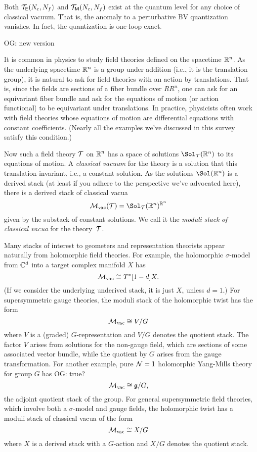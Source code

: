 \documentclass[11pt]{amsart}
\def\owen#1{{\textcolor{violet!65!black}{OG: {#1}}}}
\begin{document}
\begin{thm}
Both $\mathcal T_{\mathsf E}(N_c, N_f)$ and $\mathcal T_{{\sf M}}(N_c, N_f)$ exist at the quantum level for any choice of classical vacuum. 
That is, the anomaly to a perturbative BV quantization vanishes.
In fact, the quantization is one-loop exact. 
\end{thm}

\owen{new version}

It is common in physics to study field theories defined on the spacetime $\mathbb R^n$.
As the underlying spacetime $\mathbb R^n$ is a group under addition (i.e., it is the translation group),
it is natural to ask for field theories with an action by translations.
That is, since the fields are sections of a fiber bundle over $RR^n$,
one can ask for an equivariant fiber bundle and ask for the equations of motion (or action functional) to be equivariant under translations.
In practice, physicists often work with field theories whose equations of motion are differential equations with constant coefficients.
(Nearly all the examples we've discussed in this survey satisfy this condition.)

Now such a field theory $\mathcal T$ on $\mathbb R^n$ has a space of solutions $\Sol_\cT(\RR^n)$ to its equations of motion.
A {\em classical vacuum} for the theory is a solution that this translation-invariant,
i.e., a constant solution.
As the solutions $\Sol(\RR^n)$ is a derived stack (at least if you adhere to the perspective we've advocated here), there is a derived stack of classical vacua
\[
\cM_{\rm vac}(\cT) = \Sol_\cT(\RR^n)^{\RR^n}
\]
given by the substack of constant solutions.
We call it the {\em moduli stack of classical vacua} for the theory~$\mathcal T$.

Many stacks of interest to geometers and representation theorists appear naturally from holomorphic field theories.
For example, the holomorphic $\sigma$-model from $\mathbb C^d$ into a target complex manifold $X$ has
\[
\mathcal M_{\rm vac} \cong T^*[1-d]X.
\]
(If we consider the underlying underived stack, it is just $X$, unless $d = 1$.)
For supersymmetric gauge theories, the moduli stack of the holomorphic twist has the form
\[
\mathcal M_{\rm vac} \cong V/G
\]
where $V$ is a (graded) $G$-representation and $V/G$ denotes the quotient stack.
The factor $V$ arises from solutions for the non-gauge field, which are sections of some associated vector bundle,
while the quotient by $G$ arises from the gauge transformation.
For another example, pure $\mathcal N =1$ holomorphic Yang-Mills theory for group $G$ has \owen{true?}
\[
\mathcal M_{\rm vac} \cong \mathfrak g/G,
\]
the adjoint quotient stack of the group.
For general supersymmetric field theories, which involve both a $\sigma$-model and gauge fields, the holomorphic twist has a moduli stack of classical vacua of the form
\[
\mathcal M_{\rm vac} \cong X/G
\]
where $X$ is a derived stack with a $G$-action and $X/G$ denotes the quotient stack.
\end{document}
